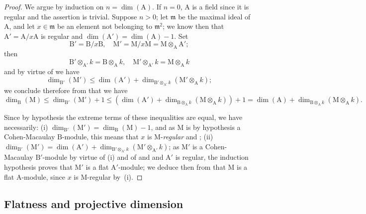 \begin{proof}
We argue by induction on $n=\dim(\mathrm{A})$.
If $n=0$, $\mathrm{A}$ is a field since it is regular  and the assertion is trivial.
Suppose $n>0$; let $\mathfrak{m}$ be the maximal ideal of $\mathrm{A}$, and let $x\in\mathfrak{m}$ be an element not belonging to $\mathfrak{m}^2$; we know then  that $\mathrm{A}'=\mathrm{A}/x\mathrm{A}$ is regular and $\dim(\mathrm{A}')=\dim(\mathrm{A})-1$.
Set
\[
  \mathrm{B}'=\mathrm{B}/x\mathrm{B},\quad \mathrm{M}'=\mathrm{M}/x\mathrm{M}=\mathrm{M}\otimes_\mathrm{A}\mathrm{A}';
\]
then
\[
  \mathrm{B}'\otimes_{\mathrm{A}'}k=\mathrm{B}\otimes_\mathrm{A} k,\quad \mathrm{M}'\otimes_{\mathrm{A}'}k=\mathrm{M}\otimes_\mathrm{A} k
\]
and by virtue of  we have
\[
  \dim_{\mathrm{B}'}(\mathrm{M}')\leqslant\dim(\mathrm{A}')+\dim_{\mathrm{B}'\otimes_{\mathrm{A}'}k}(\mathrm{M}'\otimes_\mathrm{A} k);
\]
we conclude therefore from  that we have
\[
  \dim_\mathrm{B}(\mathrm{M})\leqslant\dim_{\mathrm{B}'}(\mathrm{M}')+1\leqslant(\dim(\mathrm{A}')+\dim_{\mathrm{B}\otimes_\mathrm{A} k}(\mathrm{M}\otimes_\mathrm{A} k))+1=\dim(\mathrm{A})+\dim_{\mathrm{B}\otimes_\mathrm{A} k}(\mathrm{M}\otimes_\mathrm{A} k).
\]

Since by hypothesis the extreme terms of these inequalities are equal, we have necessarily: (i) $\dim_{\mathrm{B}'}(\mathrm{M}')=\dim_\mathrm{B}(\mathrm{M})-1$, and as $\mathrm{M}$ is by hypothesis a Cohen-Macaulay $\mathrm{B}$-module, this means that $x$ is M-\emph{regular}  and ; (ii) $\dim_{\mathrm{B}'}(\mathrm{M}')=\dim(\mathrm{A}')+\dim_{\mathrm{B}'\otimes_{\mathrm{A}'}k}(\mathrm{M}'\otimes_{\mathrm{A}'}k)$; as $\mathrm{M}'$ is a Cohen-Macaulay $\mathrm{B}'$-module by virtue of (i) and of  and  and $\mathrm{A}'$ is regular, the induction hypothesis proves that $\mathrm{M}'$ is a flat $\mathrm{A}'$-module; we deduce then from  that $\mathrm{M}$ is a flat $\mathrm{A}$-module, since $x$ is M-regular by~(i).
\end{proof}

\subsection{Flatness and projective dimension}
\label{subsection:IV.6.2}

